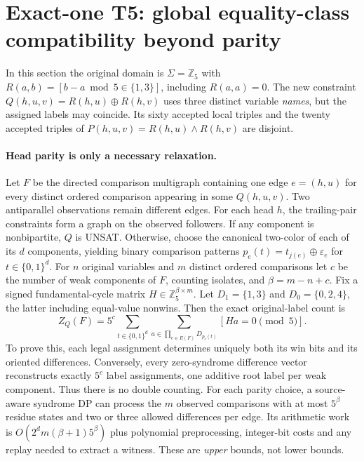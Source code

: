 \documentclass[11pt]{article}
\begin{document}
\section{Exact-one T5: global equality-class compatibility beyond parity}
\label{sec:tmr2-q-096}

In this section the original domain is $\Sigma=\mathbb Z_5$ with
$R(a,b)=[b-a\bmod 5\in\{1,3\}]$, including $R(a,a)=0$.
The new constraint $Q(h,u,v)=R(h,u)\oplus R(h,v)$ uses three
distinct variable \emph{names}, but the assigned labels may coincide.
Its sixty accepted local triples and the twenty accepted triples
of $P(h,u,v)=R(h,u)\land R(h,v)$ are disjoint.

\paragraph{Head parity is only a necessary relaxation.}
Let $F$ be the directed comparison multigraph containing one edge
$e=(h,u)$ for every distinct ordered comparison appearing in some
$Q(h,u,v)$. Two antiparallel observations remain different edges.
For each head $h$, the trailing-pair constraints form a graph on
the observed followers. If any component is nonbipartite,
$Q$ is UNSAT. Otherwise, choose the canonical two-color of
each of its $d$ components, yielding binary comparison patterns
$p_e(t)=t_{j(e)}\oplus\varepsilon_e$ for
$t\in\{0,1\}^d$. For $n$ original variables and
$m$ distinct ordered comparisons let $c$ be the number of weak
components of $F$, counting isolates, and
$\beta=m-n+c$. Fix a signed fundamental-cycle matrix
$H\in\mathbb Z_5^{\beta\times m}$. Let
$D_1=\{1,3\}$ and $D_0=\{0,2,4\}$, the latter
including equal-value nonwins. Then the exact original-label count is
\[
\boxed{
 Z_Q(F)=5^c\sum_{t\in\{0,1\}^d}
  \sum_{a\in\prod_{e\in E(F)}D_{p_e(t)}}
     [Ha=0\pmod5].
}
\tag{Q096}
\]
To prove this, each legal assignment determines uniquely
both its win bits and its oriented differences.
Conversely, every zero-syndrome difference vector reconstructs
exactly $5^c$ label assignments, one additive root label per
weak component. Thus there is no double counting.
For each parity choice, a source-aware syndrome DP can process the
$m$ observed comparisons with at most $5^\beta$ residue states and
two or three allowed differences per edge. Its arithmetic work
is $O(2^d m(\beta+1)5^\beta)$ plus polynomial preprocessing,
integer-bit costs and any replay needed to extract a witness.
These are \emph{upper} bounds, not lower bounds.
\end{document}
